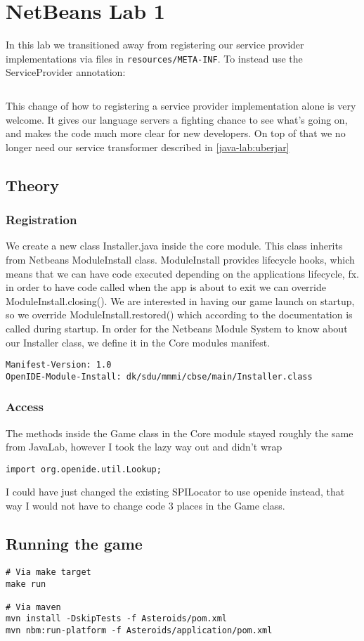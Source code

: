 \section{NetBeans Lab 1}

In this lab we transitioned away from registering our service provider
implementations via files in \texttt{resources/META-INF}. To instead use the
ServiceProvider annotation:

\inputminted{java}{code/openide-service-provider.java}

This change of how to registering a service provider implementation alone is
very welcome. It gives our language servers a fighting chance to see what's
going on, and makes the code much more clear for new developers. On top of that
we no longer need our service transformer described in \ref{java-lab:uberjar}


\subsection{Theory}
\subsubsection{Registration}
We create a new class Installer.java inside the core module. This class inherits
from Netbeans ModuleInstall class. ModuleInstall provides lifecycle hooks, which
means that we can have code executed depending on the applications lifecycle,
fx. in order to have code called when the app is about to exit we can override
ModuleInstall.closing(). We are interested in having our game launch on startup,
so we override ModuleInstall.restored() which according to the documentation
\cite{netbeans-module-install} is called during startup.
In order for the Netbeans Module System to know about our Installer class, we
define it in the Core modules manifest.

\begin{verbatim}
Manifest-Version: 1.0
OpenIDE-Module-Install: dk/sdu/mmmi/cbse/main/Installer.class
\end{verbatim}

\subsubsection{Access}
The methods inside the Game class in the Core module stayed roughly the same
from JavaLab, however I took the lazy way out and didn't wrap 
\begin{verbatim}
import org.openide.util.Lookup;
\end{verbatim}
I could have just changed the existing SPILocator to use openide instead, that way
I would not have to change code 3 places in the Game class.


\subsection{Running the game}
\begin{verbatim}
# Via make target
make run

# Via maven
mvn install -DskipTests -f Asteroids/pom.xml
mvn nbm:run-platform -f Asteroids/application/pom.xml
\end{verbatim}
